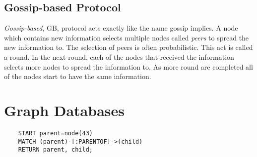 \documentclass{sig-alternate}
\begin{document}
\subsection{Gossip-based Protocol}
\label{sec:GBP}

\emph{Gossip-based}, GB, protocol acts exactly like the name gossip implies. A node which contains new information selects multiple nodes called \emph{peers} to spread the new information to. The selection of peers is often probabilistic. This act is called a round. In the next round, each of the nodes that received the information selects more nodes to spread the information to. As more round are completed all of the nodes start to have the same information. 


\section{Graph Databases}
\label{sec:Graph Databases}



\begin{verbatim}
    START parent=node(43)
    MATCH (parent)-[:PARENTOF]->(child)
    RETURN parent, child;
\end{verbatim}












\end{document}
